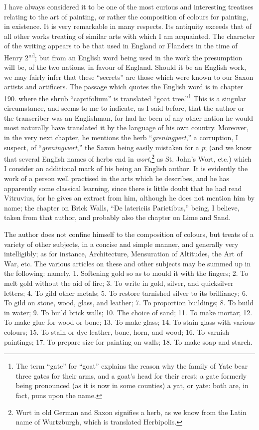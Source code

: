 \documentclass[a4paper, 11pt, oneside, polutonikogreek, italian]{article}
\begin{document}
I have always considered it to be one of the most curious and interesting treatises relating to the art of painting, or rather the composition of colours for painting, in existence. It is very remarkable in many respects. Its antiquity exceeds that of all other works treating of similar arts with which I am acquainted. The character of the writing appears to be that used in England or Flanders in the time of Henry 2\textsuperscript{nd}; but from an English word being used in the work the presumption will be, of the two nations, in favour of England. Should it be an English work, we may fairly infer that these ``secrets'' are those which were known to our Saxon artists and artificers. The passage which quotes the English word is in chapter 190. where the shrub ``caprifolium'' is translated ``goat tree.''\footnote{The term ``gate'' for ``goat'' explains the reason why the family of Yate bear three gates for their arms, and a goat's head for their crest; a gate formerly being pronounced (as it is now in some counties) a yat, or yate: both are, in fact, puns upon the name.} This is a singular circumstance, and seems to me to indicate, as I said before, that the author or the transcriber was an Englishman, for had he been of any other nation he would most naturally have translated it by the language of his own country. Moreover, in the very next chapter, he mentions the herb ``\emph{greningpert},'' a corruption, I suspect, of ``\emph{greningwert},'' the Saxon \textwynn\hspace{0.4mm} being easily mistaken for a \emph{p}; (and we know that several English names of herbs end in \emph{wort},\footnote{Wurt in old German and Saxon signifies a herb, as we know from the Latin name of Wurtzburgh, which is translated Herbipolis.} as St. John's Wort, etc.) which I consider an additional mark of his being an English author. It is evidently the work of a person well practised in the arts which he describes, and he has apparently some classical learning, since there is little doubt that he had read Vitruvius, for he gives an extract from him, although he does not mention him by name; the chapter on Brick Walls, ``De latericiis Parietibus,'' being, I believe, taken from that author, and probably also the chapter on Lime and Sand.

The author does not confine himself to the composition of colours, but treats of a variety of other subjects, in a concise and simple manner, and generally very intelligibly; as for instance, Architecture, Mensuration of Altitudes, the Art of War, etc. The various articles on these and other subjects may be summed up in the following: namely, 1. Softening gold so as to mould it with the fingers; 2. To melt gold without the aid of fire; 3. To write in gold, silver, and quicksilver letters; 4. To gild other metals; 5. To restore tarnished silver to its brilliancy; 6. To gild on stone, wood, glass, and leather; 7. To proportion buildings; 8. To build in water; 9. To build brick walls; 10. The choice of sand; 11. To make mortar; 12. To make glue for wood or bone; 13. To make glass; 14. To stain glass with various colours; 15. To stain or dye leather, bone, horn, and wood; 16. To varnish paintings; 17. To prepare size for painting on walls; 18. To make soap and starch.
\end{document}
